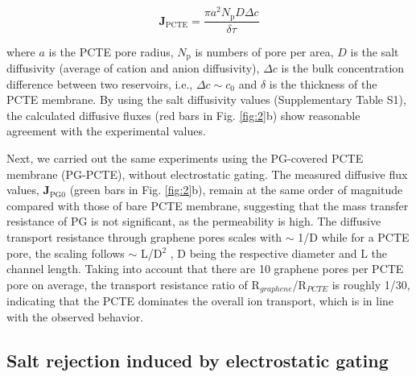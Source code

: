 \documentclass[journal=langd5,email=true, hyperref=true, keywords=false]{achemso}
\newcommand{\Fig}{Fig.}
\begin{document}
  \begin{equation}
    \label{eq:j-pcte}
    \boldsymbol{J}_{\mathrm{PCTE}} = \frac{\pi a^{2} N_{\mathrm{p}} D \Delta c}{\delta \tau}
  \end{equation}
  
where $a$ is the PCTE pore radius, $N_{\mathrm{p}}$ is numbers of pore
per area, $D$ is the salt diffusivity (average of cation and anion diffusivity), $\Delta c$ is the bulk
concentration difference between two reservoirs, i.e.,
$\Delta c \sim c_{0}$ and $\delta$ is the thickness of the PCTE membrane.
 By using the salt diffusivity values (Supplementary Table S1), the
calculated diffusive fluxes (red bars in \Fig{} \ref{fig:2}b) show
reasonable agreement with the experimental values.

Next, we carried out the same experiments using the PG-covered PCTE
membrane (PG-PCTE), without electrostatic gating. The measured
diffusive flux values, $\boldsymbol{J}_{\mathrm{PG0}}$ (green bars in
\Fig{} \ref{fig:2}b), remain at the same order of magnitude compared
with those of bare PCTE membrane, suggesting that the mass transfer
resistance of PG is not significant, as the permeability is high. 
The diffusive transport resistance through graphene pores scales with $\sim$ 1/D while
for a PCTE pore, the scaling follows $\sim$ L/D$^2$ \cite{O_Hern_2014},
 D being the respective diameter and L the channel length. 
Taking into account that there are 10 graphene pores
per PCTE pore on average, the transport resistance ratio of R$_{graphene}$/R$_{PCTE}$ is roughly 1/30,
 indicating that the PCTE dominates the overall ion transport, which is in line 
 with the observed behavior.


\subsection{Salt rejection induced by electrostatic gating}
\label{sec:res-2}
\end{document}
